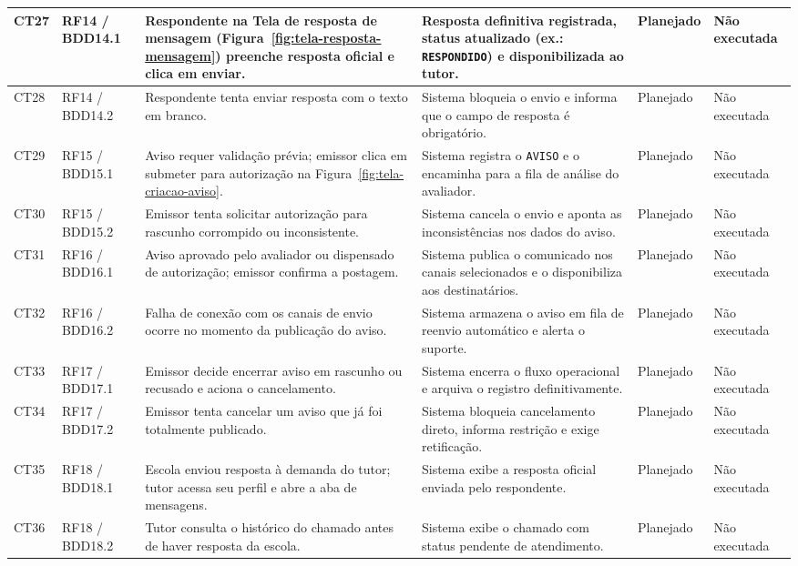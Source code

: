 \documentclass[a4paper,12pt]{report}
\begin{document}
\begin{longtable}{|p{1.2cm}|p{2.0cm}|p{3.8cm}|p{4.0cm}|p{1.6cm}|p{2.0cm}|}
\hline
CT27 & RF14 / BDD14.1 & Respondente na Tela de resposta de mensagem (Figura~\ref{fig:tela-resposta-mensagem}) preenche resposta oficial e clica em enviar. & Resposta definitiva registrada, status atualizado (ex.: \texttt{RESPONDIDO}) e disponibilizada ao tutor. & Planejado & Não executada \\
\hline
CT28 & RF14 / BDD14.2 & Respondente tenta enviar resposta com o texto em branco. & Sistema bloqueia o envio e informa que o campo de resposta é obrigatório. & Planejado & Não executada \\
\hline
CT29 & RF15 / BDD15.1 & Aviso requer validação prévia; emissor clica em submeter para autorização na Figura~\ref{fig:tela-criacao-aviso}. & Sistema registra o \texttt{AVISO} e o encaminha para a fila de análise do avaliador. & Planejado & Não executada \\
\hline
CT30 & RF15 / BDD15.2 & Emissor tenta solicitar autorização para rascunho corrompido ou inconsistente. & Sistema cancela o envio e aponta as inconsistências nos dados do aviso. & Planejado & Não executada \\
\hline
CT31 & RF16 / BDD16.1 & Aviso aprovado pelo avaliador ou dispensado de autorização; emissor confirma a postagem. & Sistema publica o comunicado nos canais selecionados e o disponibiliza aos destinatários. & Planejado & Não executada \\
\hline
CT32 & RF16 / BDD16.2 & Falha de conexão com os canais de envio ocorre no momento da publicação do aviso. & Sistema armazena o aviso em fila de reenvio automático e alerta o suporte. & Planejado & Não executada \\
\hline
CT33 & RF17 / BDD17.1 & Emissor decide encerrar aviso em rascunho ou recusado e aciona o cancelamento. & Sistema encerra o fluxo operacional e arquiva o registro definitivamente. & Planejado & Não executada \\
\hline
CT34 & RF17 / BDD17.2 & Emissor tenta cancelar um aviso que já foi totalmente publicado. & Sistema bloqueia cancelamento direto, informa restrição e exige retificação. & Planejado & Não executada \\
\hline
CT35 & RF18 / BDD18.1 & Escola enviou resposta à demanda do tutor; tutor acessa seu perfil e abre a aba de mensagens. & Sistema exibe a resposta oficial enviada pelo respondente. & Planejado & Não executada \\
\hline
CT36 & RF18 / BDD18.2 & Tutor consulta o histórico do chamado antes de haver resposta da escola. & Sistema exibe o chamado com status pendente de atendimento. & Planejado & Não executada \\

\end{longtable}
\end{document}
